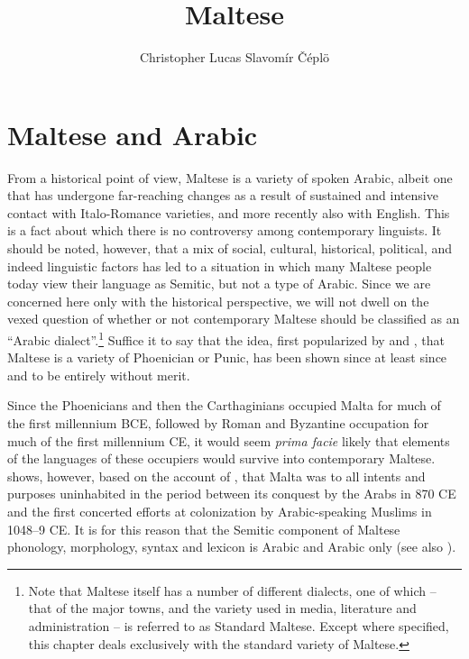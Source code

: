 \documentclass[output=paper]{langsci/langscibook}
\title{Maltese}
\author{Christopher Lucas\affiliation{SOAS University of London}\lastand 
 Slavomír Čéplö\affiliation{Institute of Oriental Studies, Slovak Academy of Sciences / IMAFO Abteilung Byzanzforschung, Österreichische Akademie der Wissenschaften}
}
\begin{document}
\maketitle
\section{Maltese and Arabic} %
From a historical point of view, Maltese is a variety of spoken Arabic, albeit one that has undergone far-reaching changes as a result of sustained and intensive contact with Italo-Romance varieties, and more recently also with English. This is a fact about which there is no controversy among contemporary linguists. It should be noted, however, that a mix of social, cultural, historical, political, and indeed linguistic factors has led to a situation in which many Maltese people today view their language as Semitic, but not a type of Arabic. Since we are concerned here only with the historical perspective, we will not dwell on the vexed question of whether or not contemporary Maltese should be classified as an ``Arabic dialect''.\footnote{Note that Maltese itself has a number of different dialects, one of which -- that of the major towns, and the variety used in media, literature and administration -- is referred to as Standard Maltese. Except where specified, this chapter deals exclusively with the standard variety of Maltese.} Suffice it to say that the idea, first popularized by \cite{desoldanis1750} and \cite{vassalli1791}, that Maltese is a variety of Phoenician or Punic, has been shown since at least since \cite{gesenius1810} and \cite{desacy1829} to be entirely without merit.

Since the Phoenicians and then the Carthaginians occupied Malta for much of the first millennium BCE, followed by Roman and Byzantine occupation for much of the first millennium CE, it would seem \textit{prima facie} likely that elements of the languages of these occupiers would survive into contemporary Maltese. \cite{brincat1995} shows, however, based on the account of , that Malta was to all intents and purposes uninhabited in the period between its conquest by the Arabs in 870 CE and the first concerted efforts at colonization by Arabic-speaking Muslims in 1048--9 CE. It is for this reason that the Semitic component of Maltese phonology, morphology, syntax and lexicon is Arabic and Arabic only (see also \citealt{grech1961}).
\end{document}
